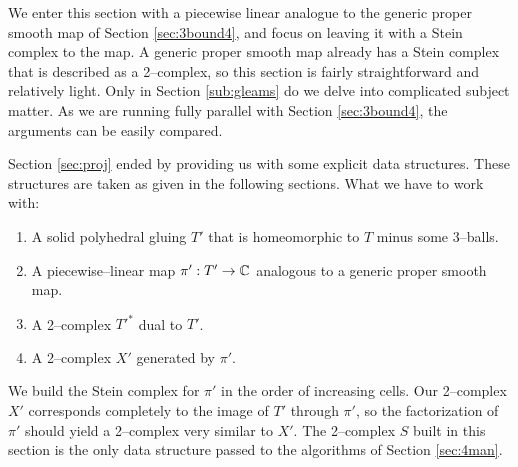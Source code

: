 We enter this section with a piecewise linear analogue to the generic proper smooth map of Section \ref{sec:3bound4}, and focus on leaving it with a Stein complex to the map.
A generic proper smooth map already has a Stein complex that is described as a 2--complex, so this section is fairly straightforward and relatively light.
Only in Section \ref{sub:gleams} do we delve into complicated subject matter.
As we are running fully parallel with Section \ref{sec:3bound4}, the arguments can be easily compared.

Section \ref{sec:proj} ended by providing us with some explicit data structures.
These structures are taken as given in the following sections.
What we have to work with:
\begin{enumerate}
	\item A solid polyhedral gluing $T'$ that is homeomorphic to $T$ minus some 3--balls.
	\item A piecewise--linear map $\pi':T'\to\mathbb{C}$ analogous to a generic proper smooth map.
	\item A 2--complex $T'^*$ dual to $T'$.
	\item A 2--complex $X'$ generated by $\pi'$.
\end{enumerate}
We build the Stein complex for $\pi'$ in the order of increasing cells.
Our 2--complex $X'$ corresponds completely to the image of $T'$ through $\pi'$, so the factorization of $\pi'$ should yield a 2--complex very similar to $X'$.
The 2--complex $S$ built in this section is the only data structure passed to the algorithms of Section \ref{sec:4man}.